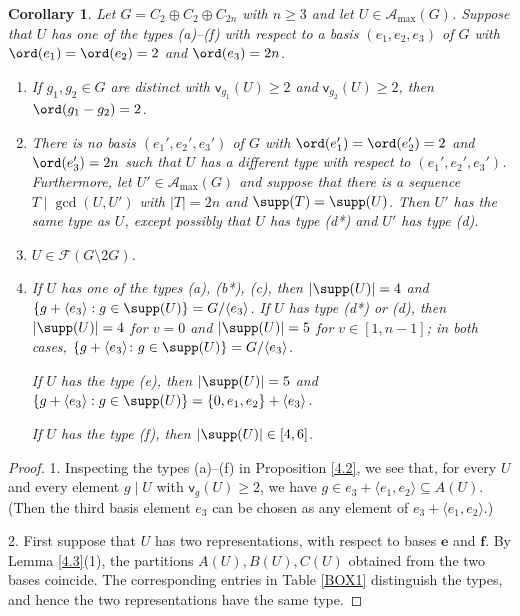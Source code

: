 \documentclass[a4paper, 10pt]{amsart}
\theoremstyle{plain}
\newtheorem{corollary}[theorem]{\bf Corollary}
\theoremstyle{definition}
\numberwithin{equation}{section}
\begin{document}
{\begin{table}
\end{table}


\begin{corollary} \label{4.4}
Let $G = C_2 \oplus C_2 \oplus C_{2n}$ with $n\geq 3$ and let $U \in \mathcal A_{\max} (G)$. Suppose that $U$ has one of the types (a)--(f) with respect to a basis $(e_1, e_2, e_3)$ of $G$ with $\ord (e_1)=\ord (e_2)=2$ and $\ord (e_3) = 2n$. 
\begin{enumerate}
\item If $g_1,g_2\in G$ are distinct with $\mathsf{v}_{g_1}(U)\ge 2$ and $\mathsf{v}_{g_2}(U)\ge 2$, then $\ord(g_1-g_2)=2$. 

\item There is no basis $(e_1',e_2',e_3')$ of $G$ with $\ord(e_1')=\ord(e_2')=2$ and $\ord(e_3')=2n$ such that $U$ has a different type with respect to $(e_1',e_2',e_3')$. Furthermore, let $U'\in\mathcal A_{\max}(G)$ and suppose that there is a sequence $T\mid\gcd(U,U')$ with $|T|=2n$ and $\supp(T)=\supp(U)$. Then $U'$ has the same type as $U$, except possibly that $U$ has type (d*) and $U'$ has type (d).

\item $U\in \mathcal F (G\setminus 2G)$.

\item If $U$ has one of the types (a), (b*), (c), then $|\supp(U)|=4$ and $\{g+\langle e_3\rangle:g\in\supp(U)\}= G/\langle e_3\rangle$. 
If $U$ has type (d*) or (d), then $|\supp(U)|=4$ for $v=0$ and $|\supp(U)|=5$ for $v \in [1, n-1]$; in both cases, $\{g+\langle e_3\rangle\colon g\in\supp(U)\}=G/\langle e_3\rangle$.

\noindent
If $U$ has the type (e), then $|\supp(U)|=5$ and $\{g+\langle e_3\rangle:g\in\supp(U)\}= \{0,e_1,e_2\}+\langle e_3\rangle$.

\noindent
If $U$ has the type (f), then $|\supp(U)| \in [4, 6]$.

\end{enumerate}
\end{corollary}



\begin{proof}
1. Inspecting the types (a)--(f) in Proposition \ref{4.2}, we see that, for every $U$ and every element $g\mid U$ with  $\mathsf v_g(U)\ge 2$, we have $g\in e_3 +\langle e_1, e_2\rangle\subseteq A(U)$. (Then the third basis element $e_3$ can be chosen as any element of $e_3 +\langle e_1, e_2\rangle$.) 


2. First suppose that $U$ has two representations, with respect to bases $\boldsymbol e$ and $\boldsymbol f$. By Lemma \ref{4.3}(1), the partitions $A(U),B(U),C(U)$ obtained from the two bases coincide. The corresponding entries in Table \ref{BOX1} distinguish the types, and hence the two representations have the same type.


\end{proof}}
\end{document}
